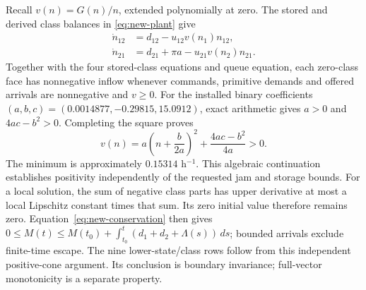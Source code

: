 \documentclass[journal,10pt]{IEEEtran}
\begin{document}
Recall $v(n)=G(n)/n$, extended polynomially at zero. The stored and derived
class balances in \eqref{eq:new-plant} give
\begin{equation}
 \begin{aligned}
 \dot n_{12}&=d_{12}-u_{12}v(n_1)n_{12},\\
 \dot n_{21}&=d_{21}+\pi a-u_{21}v(n_2)n_{21}.
 \end{aligned}
 \label{eq:structure-derived-classes}
\end{equation}
Together with the four stored-class equations and queue equation, each
zero-class face has nonnegative inflow whenever commands, primitive demands
and offered arrivals are nonnegative and $v\ge0$. For the installed
binary coefficients $(a,b,c)=(0.0014877,-0.29815,15.0912)$, exact arithmetic gives
$a>0$ and $4ac-b^2>0$. Completing the square proves
\begin{equation}
 v(n)=a\left(n+\frac{b}{2a}\right)^2+
                    \frac{4ac-b^2}{4a}>0.
 \label{eq:structure-positive-factor}
\end{equation}
The minimum is approximately $0.15314$ h$^{-1}$. This algebraic continuation
establishes positivity independently of the requested jam and storage bounds.
For a local solution, the sum of negative class parts has upper derivative
at most a local Lipschitz constant times that sum. Its zero initial value
therefore remains zero. Equation~\eqref{eq:new-conservation} then gives
$0\le M(t)\le M(t_0)+\int_{t_0}^t(d_1+d_2+\Lambda(s))\,ds$;
bounded arrivals exclude finite-time escape. The nine lower-state/class
rows follow from this independent positive-cone argument. Its conclusion
is boundary invariance; full-vector monotonicity is a separate property.
\end{document}
